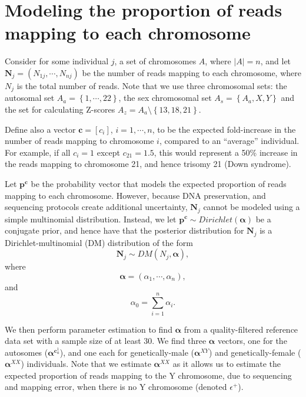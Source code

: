 \documentclass[10pt,a4paper]{article}
\begin{document}
\section{Modeling the proportion of reads mapping to each chromosome}

Consider for some individual $j$, a set of chromosomes $A$, where $|A|=n$, and let $\mathbf{N}_j=\left(N_{1j},\cdots,N_{nj}\right)$ be the number of reads mapping to each chromosome, where $N_j$ is the total number of reads. Note that we use three chromosomal sets: the autosomal set $A_a = \left\{1,\cdots,22 \right\}$, the sex chromosomal set $A_s = \left\{A_a,X,Y \right\}$ and the set for calculating Z-scores  $A_z = A_a\setminus \left\{13,18,21\right\}$.

Define also a vector $\mathbf{c} = \left[c_i\right]$, $i=1,\cdots,n$, to be the expected fold-increase in the number of reads mapping to chromosome $i$, compared to an ``average'' individual. For example, if all $c_i=1$ except $c_{21}=1.5$, this would represent a 50\% increase in the reads mapping to chromosome 21, and hence trisomy 21 (Down syndrome).

Let $\mathbf{p}^{\mathbf{c}}$ be the probability vector that models the expected proportion of reads mapping to each chromosome. However, because DNA preservation, and sequencing protocols create additional uncertainty, $\mathbf{N}_j$ cannot be modeled using a simple multinomial distribution. Instead, we let $\mathbf{p}^{\mathbf{c}} \sim Dirichlet\left(\bm{\alpha}\right)$ be a conjugate prior, and hence have that the posterior distribution for 
$\bm{N}_j$ is a Dirichlet-multinomial (DM) distribution of the form
\begin{equation*}
    \bm{N}_j \sim DM\left(N_j,\bm{\alpha}\right),
\end{equation*}
where
\begin{equation*}
    \bm{\alpha} = \left(\alpha_1,\cdots,\alpha_n \right),
\end{equation*}
and
\begin{equation*}
    \alpha_0 = \sum_{i=1}^{n}\alpha_i.
\end{equation*}

We then perform parameter estimation to find $\bm{\alpha}$ from a quality-filtered reference data set with a sample size of at least 30\cite{rohrlach2026chasm}. We find three $\bm{\alpha}$ vectors, one for the autosomes ($\bm{\alpha}^{\bm{c}^{1}_{a}}$), and one each for genetically-male ($\bm{\alpha}^{XY}$) and genetically-female ($\bm{\alpha}^{XX}$) individuals. Note that we estimate $\bm{\alpha}^{XX}$ as it allows us to estimate the expected proportion of reads mapping to the Y chromosome, due to sequencing and mapping error, when there is no Y chromosome (denoted $\epsilon^+$).
\end{document}
